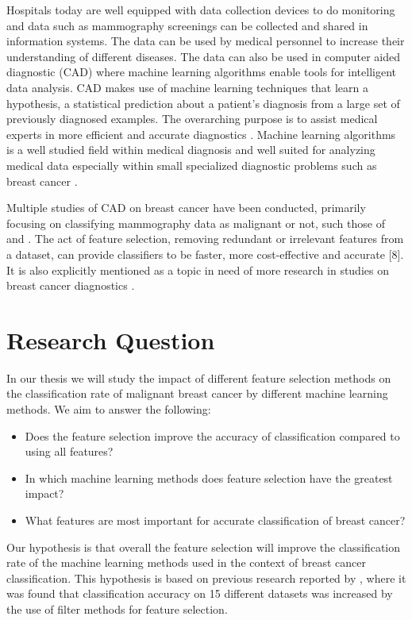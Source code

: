 \documentclass{kththesis}
\begin{document}
Hospitals today are well equipped with data collection devices to do monitoring and data such as mammography screenings can be collected and shared in information systems. The data can be used by medical personnel to increase their understanding of different diseases. The data can also be used in computer aided diagnostic (CAD) where machine learning algorithms enable tools for intelligent data analysis. CAD makes use of machine learning techniques that learn a hypothesis, a statistical prediction about a patient's diagnosis from a large set of previously diagnosed examples.  The overarching purpose is to assist medical experts in more efficient and accurate diagnostics \parencite{li2007}. Machine learning algorithms is a well studied field within medical diagnosis and well suited for analyzing medical data especially within small specialized diagnostic problems such as breast cancer \parencite{kononenko2001}.

Multiple studies of CAD on breast cancer have been conducted, primarily focusing on classifying mammography data as malignant or not, such those of \textcite{ramos2012} and \textcite{akay2009}. The act of feature selection, removing redundant or irrelevant features from a dataset, can provide classifiers to be faster, more cost-effective and accurate [8]. It is also explicitly mentioned as a topic in need of more research in studies on breast cancer diagnostics \parencite{akin2011}.

\section{Research Question}

In our thesis we will study the impact of different feature selection methods on the classification rate of malignant breast cancer by different machine learning methods. We aim to answer the following:

\begin{itemize}
  \item Does the feature selection improve the accuracy of classification compared to using all features?
  \item In which machine learning methods does feature selection have the greatest impact?
  \item What features are most important for accurate classification of breast cancer?
\end{itemize}

Our hypothesis is that overall the feature selection will improve the classification rate of the machine learning methods used in the context of breast cancer classification. This hypothesis is based on previous research reported by \textcite{karabulut2012}, where it was found that classification accuracy on 15 different datasets was increased by the use of filter methods for feature selection.
\end{document}
